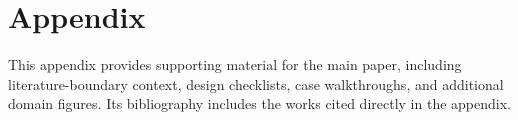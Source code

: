 \documentclass[manuscript,screen,review]{acmart}
\begin{document}
\appendix
\section*{Appendix}

This appendix provides supporting material for the main paper, including literature-boundary context, design checklists, case walkthroughs, and additional domain figures. Its bibliography includes the works cited directly in the appendix.






\FloatBarrier



\end{document}
